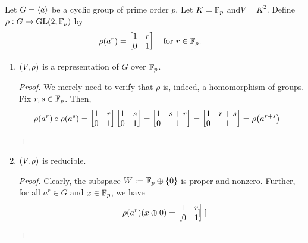 \begin{boxnexample}
    Let $G = \left\langle a \right\rangle$ be a cyclic group of prime order $p$. Let $K = \mathbb{F}_p$ and$V = K^2$. Define $\rho : G \to \operatorname{GL}\!\left( 2,\mathbb{F}_p \right)$ by
    \begin{align*}
        \rho\!\left( a^r \right) &= \begin{bmatrix}
            1 & r \\ 0 & 1
        \end{bmatrix}
        \quad \text{for $r \in \mathbb{F}_p$.} 
    \end{align*}
    \begin{enumerate}
        \item $\left( V, \rho \right)$ is a representation of $G$ over $\mathbb{F}_p$.
        \begin{proof}
            We merely need to verify that $\rho$ is, indeed, a homomorphism of groups. Fix $r,s \in \mathbb{F}_p$. Then,
            \begin{align*}
                \rho\!\left( a^r \right) \circ \rho\!\left( a^s \right) &= \begin{bmatrix}
                    1 & r \\ 0 & 1
                \end{bmatrix} \begin{bmatrix}
                    1 & s \\ 0 & 1
                \end{bmatrix} = \begin{bmatrix}
                    1 & s + r \\ 0 & 1
                \end{bmatrix} = \begin{bmatrix}
                    1 & r + s \\ 0 & 1
                \end{bmatrix} = \rho\!\left( a^{r + s} \right)
            \end{align*}
        \end{proof}
        \item $\left( V, \rho \right)$ is reducible.
        \begin{proof}
            Clearly, the subspace $W := \mathbb{F}_p \oplus \left\{ 0 \right\}$ is proper and nonzero. Further, for all $a^r \in G$ and $x \in \mathbb{F}_p$, we have
            \begin{align*}
                \rho\!\left( a^r \right)\!\left( x \oplus 0 \right) =
                \begin{bmatrix}
                    1 & r \\ 0 & 1
                \end{bmatrix}
                \begin{bmatrix}

\end{bmatrix}
\end{align*}
\end{proof}
\end{enumerate}
\end{boxnexample}
